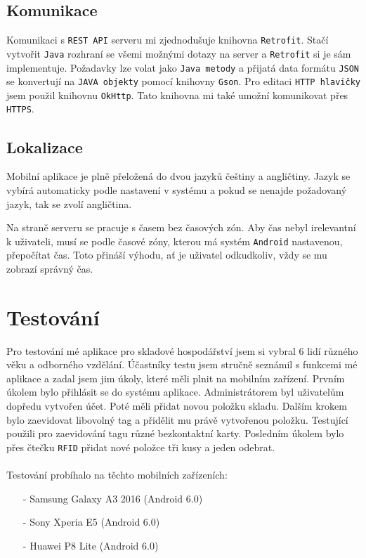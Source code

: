 \documentclass[czech,BP]{thesiskiv}
\begin{document}
\section{Komunikace}
	Komunikaci s \texttt{REST API} serveru mi zjednodušuje knihovna \texttt{Retrofit}.
	Stačí vytvořit \texttt{Java} rozhraní se všemi možnými dotazy na server a \texttt{Retrofit} si je sám implementuje.
	Požadavky lze volat jako \texttt{Java metody} a přijatá data formátu \texttt{JSON} se konvertují na \texttt{JAVA objekty} pomocí knihovny \texttt{Gson}. 
	Pro editaci \texttt{HTTP hlavičky} jsem použil knihovnu \texttt{OkHttp}. Tato knihovna mi také umožní komunikovat přes \texttt{HTTPS}. 


\section{Lokalizace}
Mobilní aplikace je plně přeložená do dvou jazyků češtiny a angličtiny.
Jazyk se vybírá automaticky podle nastavení v systému a pokud se nenajde požadovaný jazyk, tak se zvolí angličtina. 

Na straně serveru se pracuje s časem bez časových zón.
Aby čas nebyl irelevantní k uživateli, musí se podle časové zóny, kterou má systém \texttt{Android} nastavenou, přepočítat čas.
Toto přináší výhodu, ať je uživatel odkudkoliv, vždy se mu zobrazí správný čas.











\chapter{Testování}	
Pro testování mé aplikace pro skladové hospodářství jsem si vybral 6 lidí různého věku a odborného vzdělání. Účastníky testu jsem 
stručně seznámil s funkcemi mé aplikace a zadal jsem jim úkoly, které měli plnit na mobilním zařízení. 
Prvním úkolem bylo přihlásit se do systému aplikace. Administrátorem byl uživatelům dopředu vytvořen účet. Poté měli přidat novou položku skladu. 
Dalším krokem bylo zaevidovat libovolný tag a přidělit mu právě vytvořenou položku. 
Testující použili pro zaevidování tagu různé bezkontaktní karty.  
Posledním úkolem bylo přes čtečku \texttt{RFID} přidat nové položce tři kusy a jeden odebrat.
\\\\
Testování probíhalo na těchto mobilních zařízeních:
\begin{itemize}[noitemsep]
	\item [-] Samsung Galaxy A3 2016 (Android 6.0)
	\item [-] Sony Xperia E5 (Android 6.0)
	\item [-] Huawei P8 Lite (Android 6.0)
\end{itemize}
\end{document}
